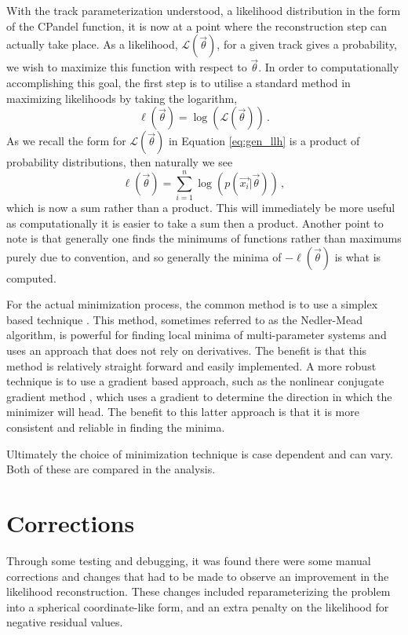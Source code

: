 With the track parameterization understood, a likelihood distribution in the form of the CPandel function, it is now at a point where the reconstruction step can actually take place. As a likelihood, $\mathcal{L}(\vec{\theta})$, for a given track gives a probability, we wish to maximize this function with respect to $\vec{\theta}$. In order to computationally accomplishing this goal, the first step is to utilise a standard method in maximizing likelihoods by taking the logarithm,
\begin{equation}  
  \ell(\vec{\theta}) = \log\left(\mathcal{L}(\vec{\theta})\right)\, .
\end{equation}
As we recall the form for $\mathcal{L}(\vec{\theta})$ in Equation \ref{eq:gen_llh} is a product of probability distributions, then naturally we see
\begin{equation}
  \ell(\vec{\theta}) = \sum_{i=1}^{n}\log\left(p\left(\vec{x_{i}}\bigr\rvert\vec{\theta}\right)\right)\, ,
\end{equation}
which is now a sum rather than a product. This will immediately be more useful as computationally it is easier to take a sum then a product. Another point to note is that generally one finds the minimums of functions rather than maximums purely due to convention, and so generally the minima of $-\ell(\vec{\theta})$ is what is computed.

For the actual minimization process, the common method is to use a simplex based technique \cite{simplex}. This method, sometimes referred to as the Nedler-Mead algorithm, is powerful for finding local minima of multi-parameter systems and uses an approach that does not rely on derivatives. The benefit is that this method is relatively straight forward and easily implemented. A more robust technique is to use a gradient based approach, such as the nonlinear conjugate gradient method \cite{gradient}, which uses a gradient to determine the direction in which the minimizer will head. The benefit to this latter approach is that it is more consistent and reliable in finding the minima.

Ultimately the choice of minimization technique is case dependent and can vary. Both of these are compared in the analysis.

\section{Corrections}

Through some testing and debugging, it was found there were some manual corrections and changes that had to be made to observe an improvement in the likelihood reconstruction. These changes included reparameterizing the problem into a spherical coordinate-like form, and an extra penalty on the likelihood for negative residual values.

